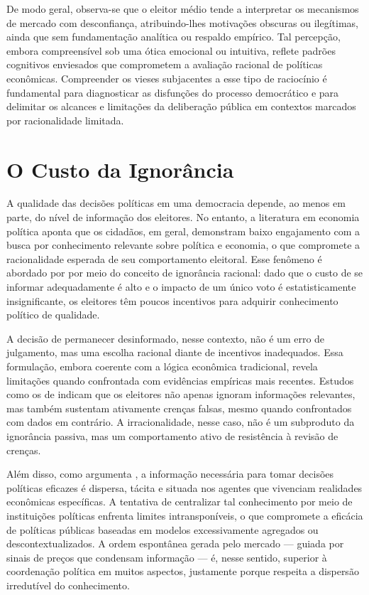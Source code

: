 De modo geral, observa-se que o eleitor médio tende a interpretar os mecanismos de mercado com desconfiança, atribuindo-lhes motivações obscuras ou ilegítimas, ainda que sem fundamentação analítica ou respaldo empírico. Tal percepção, embora compreensível sob uma ótica emocional ou intuitiva, reflete padrões cognitivos enviesados que comprometem a avaliação racional de políticas econômicas. Compreender os vieses subjacentes a esse tipo de raciocínio é fundamental para diagnosticar as disfunções do processo democrático e para delimitar os alcances e limitações da deliberação pública em contextos marcados por racionalidade limitada.

\section{O Custo da Ignorância} %


A qualidade das decisões políticas em uma democracia depende, ao menos em parte, do nível de informação dos eleitores. No entanto, a literatura em economia política aponta que os cidadãos, em geral, demonstram baixo engajamento com a busca por conhecimento relevante sobre política e economia, o que compromete a racionalidade esperada de seu comportamento eleitoral. Esse fenômeno é abordado por  por meio do conceito de ignorância racional: dado que o custo de se informar adequadamente é alto e o impacto de um único voto é estatisticamente insignificante, os eleitores têm poucos incentivos para adquirir conhecimento político de qualidade.

A decisão de permanecer desinformado, nesse contexto, não é um erro de julgamento, mas uma escolha racional diante de incentivos inadequados. Essa formulação, embora coerente com a lógica econômica tradicional, revela limitações quando confrontada com evidências empíricas mais recentes. Estudos como os de  indicam que os eleitores não apenas ignoram informações relevantes, mas também sustentam ativamente crenças falsas, mesmo quando confrontados com dados em contrário. A irracionalidade, nesse caso, não é um subproduto da ignorância passiva, mas um comportamento ativo de resistência à revisão de crenças.

Além disso, como argumenta , a informação necessária para tomar decisões políticas eficazes é dispersa, tácita e situada nos agentes que vivenciam realidades econômicas específicas. A tentativa de centralizar tal conhecimento por meio de instituições políticas enfrenta limites intransponíveis, o que compromete a eficácia de políticas públicas baseadas em modelos excessivamente agregados ou descontextualizados. A ordem espontânea gerada pelo mercado — guiada por sinais de preços que condensam informação — é, nesse sentido, superior à coordenação política em muitos aspectos, justamente porque respeita a dispersão irredutível do conhecimento.

